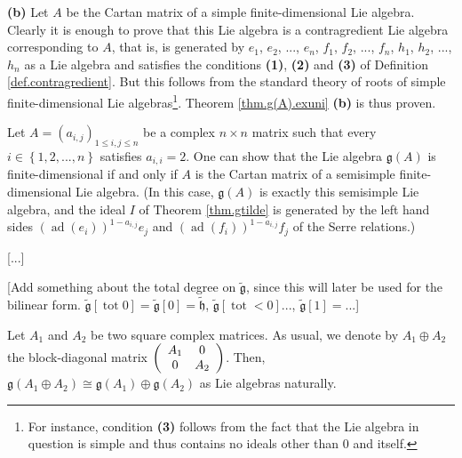 \documentclass[etingof-lie.tex]{subfiles}
\begin{document}
\textbf{(b)} Let $A$ be the Cartan matrix of a simple finite-dimensional Lie
algebra. Clearly it is enough to prove that this Lie algebra is a
contragredient Lie algebra corresponding to $A$, that is, is generated by
$e_{1}$, $e_{2}$, $...$, $e_{n}$, $f_{1}$, $f_{2}$, $...$, $f_{n}$, $h_{1}$,
$h_{2}$, $...$, $h_{n}$ as a Lie algebra and satisfies the conditions
\textbf{(1)}, \textbf{(2)} and \textbf{(3)} of Definition
\ref{def.contragredient}. But this follows from the standard theory of roots
of simple finite-dimensional Lie algebras\footnote{For instance, condition
\textbf{(3)} follows from the fact that the Lie algebra in question is simple
and thus contains no ideals other than $0$ and itself.}. Theorem
\ref{thm.g(A).exuni} \textbf{(b)} is thus proven.

\begin{remark}
Let $A=\left(  a_{i,j}\right)  _{1\leq i,j\leq n}$ be a complex $n\times n$
matrix such that every $i\in\left\{  1,2,...,n\right\}  $ satisfies
$a_{i,i}=2$. One can show that the Lie algebra $\mathfrak{g}\left(  A\right)
$ is finite-dimensional if and only if $A$ is the Cartan matrix of a
semisimple finite-dimensional Lie algebra. (In this case, $\mathfrak{g}\left(
A\right)  $ is exactly this semisimple Lie algebra, and the ideal $I$ of
Theorem \ref{thm.gtilde} is generated by the left hand sides $\left(
\operatorname*{ad}\left(  e_{i}\right)  \right)  ^{1-a_{i,j}}e_{j}$ and
$\left(  \operatorname*{ad}\left(  f_{i}\right)  \right)  ^{1-a_{i,j}}f_{j}$
of the Serre relations.)
\end{remark}

[...]

[Add something about the total degree on $\widetilde{\mathfrak{g}}$, since
this will later be used for the bilinear form. $\widetilde{\mathfrak{g}%
}\left[  \operatorname*{tot}0\right]  =\widetilde{\mathfrak{g}}\left[
0\right]  =\widetilde{\mathfrak{h}}$, $\widetilde{\mathfrak{g}}\left[
\operatorname*{tot}<0\right]  ...$, $\widetilde{\mathfrak{g}}\left[  1\right]
=...$]

\begin{remark}
\label{rmk.g(A+A)}Let $A_{1}$ and $A_{2}$ be two square complex matrices. As
usual, we denote by $A_{1}\oplus A_{2}$ the block-diagonal matrix $\left(
\begin{array}
[c]{cc}%
A_{1} & 0\\
0 & A_{2}%
\end{array}
\right)  $. Then, $\mathfrak{g}\left(  A_{1}\oplus A_{2}\right)
\cong\mathfrak{g}\left(  A_{1}\right)  \oplus\mathfrak{g}\left(  A_{2}\right)
$ as Lie algebras naturally.
\end{remark}
\end{document}

